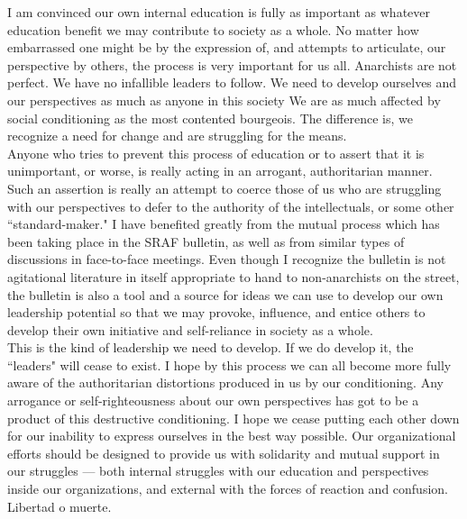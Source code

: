 I am convinced our own internal education is fully as important as whatever education benefit we may contribute to society as a whole. No matter how embarrassed one might be by the expression of, and attempts to articulate, our perspective by others, the process is very important for us all. Anarchists are not perfect. We have no infallible leaders to follow. We need to develop ourselves and our perspectives as much as anyone in this society We are as much affected by social conditioning as the most contented bourgeois. The difference is, we recognize a need for change and are struggling for the means.\\
Anyone who tries to prevent this process of education or to assert that it is unimportant, or worse, is really acting in an arrogant, authoritarian manner. Such an assertion is really an attempt to coerce those of us who are struggling with our perspectives to defer to the authority of the intellectuals, or some other ``standard-maker." I have benefited greatly from the mutual process which has been taking place in the SRAF bulletin, as well as from similar types of discussions in face-to-face meetings. Even though I recognize the bulletin is not agitational literature in itself appropriate to hand to non-anarchists on the street, the bulletin is also a tool and a source for ideas we can use to develop our own leadership potential so that we may provoke, influence, and entice others to develop their own initiative and self-reliance in society as a whole.\\
This is the kind of leadership we need to develop. If we do develop it, the ``leaders" will cease to exist. I hope by this process we can all become more fully aware of the authoritarian distortions produced in us by our conditioning. Any arrogance or self-righteousness about our own perspectives has got to be a product of this destructive conditioning. I hope we cease putting each other down for our inability to express ourselves in the best way possible. Our organizational efforts should be designed to provide us with solidarity and mutual support in our struggles --- both internal struggles with our education and perspectives inside our organizations, and external with the forces of reaction and confusion. Libertad o muerte.